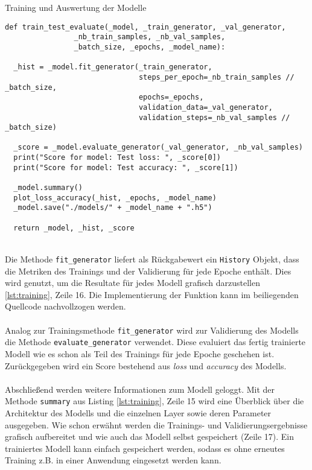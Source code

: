\begin{listing} [ht]
	\caption{Training und Auswertung der Modelle}
	\label{lst:training}
	\begin{verbatim}
def train_test_evaluate(_model, _train_generator, _val_generator,
				_nb_train_samples, _nb_val_samples,
				_batch_size, _epochs, _model_name):
	
  _hist = _model.fit_generator(_train_generator,
                               steps_per_epoch=_nb_train_samples // _batch_size,
                               epochs=_epochs,
                               validation_data=_val_generator,
                               validation_steps=_nb_val_samples // _batch_size)
	
  _score = _model.evaluate_generator(_val_generator, _nb_val_samples)
  print("Score for model: Test loss: ", _score[0])
  print("Score for model: Test accuracy: ", _score[1])
	
  _model.summary()
  plot_loss_accuracy(_hist, _epochs, _model_name)
  _model.save("./models/" + _model_name + ".h5")
	
  return _model, _hist, _score
	\end{verbatim}
\end{listing} \ \\
%
Die Methode \texttt{fit\_generator} liefert als Rückgabewert ein \texttt{History} Objekt, dass die Metriken des Trainings und der Validierung für jede Epoche enthält. Dies wird genutzt, um die Resultate für jedes Modell grafisch darzustellen \ref{lst:training}, Zeile 16. Die Implementierung der Funktion kann im beiliegenden Quellcode nachvollzogen werden. \\
\\
Analog zur Trainingsmethode \texttt{fit\_generator} wird zur Validierung des Modells die Methode \texttt{evaluate\_generator} verwendet. Diese evaluiert das fertig trainierte Modell wie es schon als Teil des Trainings für jede Epoche geschehen ist. Zurückgegeben wird ein Score bestehend aus \textit{loss} und \textit{accuracy} des Modells. \\ 
\\
Abschließend werden weitere Informationen zum Modell geloggt. Mit der Methode \texttt{summary} aus Listing \ref{lst:training}, Zeile 15 wird eine Überblick über die Architektur des Modells und die einzelnen Layer sowie deren Parameter ausgegeben. Wie schon erwähnt werden die Trainings- und Validierungsergebnisse grafisch aufbereitet und wie auch das Modell selbst gespeichert (Zeile 17). Ein trainiertes Modell kann einfach gespeichert werden, sodass es ohne erneutes Training z.B. in einer Anwendung eingesetzt werden kann. \\
\\

